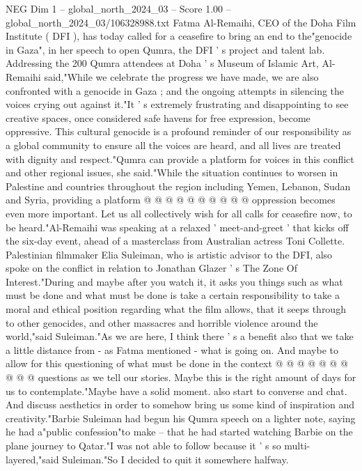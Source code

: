 \begin{textsample}{NEG Dim 1 – global\_north\_2024\_03 – Score 1.00 – global\_north\_2024\_03/106328988.txt}  \label{ex:f1_neg_390}
Fatma Al-Remaihi, CEO of the Doha Film Institute ( DFI ), has today called for a ceasefire to bring an end to the"genocide in Gaza", in her speech to open Qumra, the DFI ' s project and talent lab.
Addressing the 200 Qumra attendees at Doha ' s Museum of Islamic Art, Al-Remaihi said,"While we celebrate the progress we have made, we are also confronted with a genocide in Gaza ; and the ongoing attempts in silencing the voices crying out against it."It ' s extremely frustrating and disappointing to see creative spaces, once considered safe havens for free expression, become oppressive.
This cultural genocide is a profound reminder of our responsibility as a global community to ensure all the voices are heard, and all lives are treated with dignity and respect."Qumra can provide a platform for voices in this conflict and other regional issues, she said."While the situation continues to worsen in Palestine and countries throughout the region including Yemen, Lebanon, Sudan and Syria, providing a platform @ @ @ @ @ @ @ @ @ @ oppression becomes even more important.
Let us all collectively wish for all calls for ceasefire now, to be heard."Al-Remaihi was speaking at a relaxed ' meet-and-greet ' that kicks off the six-day event, ahead of a masterclass from Australian actress Toni Collette.
Palestinian filmmaker Elia Suleiman, who is artistic advisor to the DFI, also spoke on the conflict in relation to Jonathan Glazer ' s The Zone Of Interest."During and maybe after you watch it, it asks you things such as what must be done and what must be done is take a certain responsibility to take a moral and ethical position regarding what the film allows, that it seeps through to other genocides, and other massacres and horrible violence around the world,"said Suleiman."As we are here, I think there ' s a benefit also that we take a little distance from - as Fatma mentioned - what is going on.
And maybe to allow for this questioning of what must be done in the context @ @ @ @ @ @ @ @ @ @ questions as we tell our stories.
Maybe this is the right amount of days for us to contemplate."Maybe have a solid moment. also start to converse and chat.
And discuss aesthetics in order to somehow bring us some kind of inspiration and creativity."Barbie Suleiman had begun his Qumra speech on a lighter note, saying he had a"public confession"to make -- that he had started watching Barbie on the plane journey to Qatar."I was not able to follow because it ' s so multi-layered,"said Suleiman."So I decided to quit it somewhere halfway.

\end{textsample}
